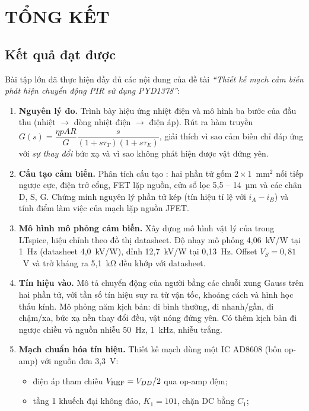 \chapter{TỔNG KẾT}
\label{chap:tongket}

\section{Kết quả đạt được}

Bài tập lớn đã thực hiện đầy đủ các nội dung của đề tài \emph{``Thiết kế mạch cảm biến phát hiện chuyển động PIR sử dụng PYD1378''}:

\begin{enumerate}
  \item \textbf{Nguyên lý đo.} Trình bày hiệu ứng nhiệt điện và mô hình ba bước của đầu thu (nhiệt $\to$ dòng nhiệt điện $\to$ điện áp). Rút ra hàm truyền $G(s) = \dfrac{\eta pAR}{G}\dfrac{s}{(1+s\tau_T)(1+s\tau_E)}$, giải thích vì sao cảm biến chỉ đáp ứng với \emph{sự thay đổi} bức xạ và vì sao không phát hiện được vật đứng yên.
  \item \textbf{Cấu tạo cảm biến.} Phân tích cấu tạo \PYD{}: hai phần tử gốm $2\times1$~mm$^2$ nối tiếp ngược cực, điện trở cổng, FET lặp nguồn, cửa sổ lọc 5,5 -- 14~µm và các chân D, S, G. Chứng minh nguyên lý phần tử kép (tín hiệu tỉ lệ với $i_A - i_B$) và tính điểm làm việc của mạch lặp nguồn JFET.
  \item \textbf{Mô hình mô phỏng cảm biến.} Xây dựng mô hình vật lý của \PYD{} trong LTspice, hiệu chỉnh theo đồ thị datasheet. Độ nhạy mô phỏng 4,06~kV/W tại 1~Hz (datasheet 4,0~kV/W), đỉnh 12,7~kV/W tại 0,13~Hz. Offset $V_S = 0{,}81$~V và trở kháng ra 5,1~kΩ đều khớp với datasheet.
  \item \textbf{Tín hiệu vào.} Mô tả chuyển động của người bằng các chuỗi xung Gauss trên hai phần tử, với tần số tín hiệu suy ra từ vận tốc, khoảng cách và hình học thấu kính. Mô phỏng năm kịch bản: đi bình thường, đi nhanh/gần, đi chậm/xa, bức xạ nền thay đổi đều, vật nóng đứng yên. Có thêm kịch bản đi ngược chiều và nguồn nhiễu 50~Hz, 1~kHz, nhiễu trắng.
  \item \textbf{Mạch chuẩn hóa tín hiệu.} Thiết kế mạch dùng một IC AD8608 (bốn op-amp) với nguồn đơn 3,3~V:
  \begin{itemize}
    \item điện áp tham chiếu $V_\mathrm{REF} = V_{DD}/2$ qua op-amp đệm;
    \item tầng 1 khuếch đại không đảo, $K_1 = 101$, chặn DC bằng $C_1$;

\end{itemize}
\end{enumerate}
